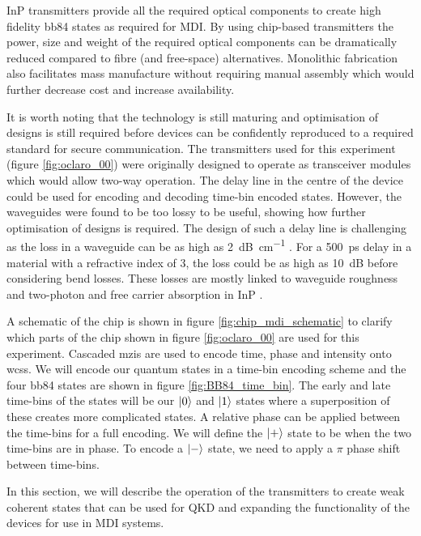 \Ac{InP} transmitters provide all the required optical components to create high fidelity \ac{bb84} states as required for \ac{MDI}. By using chip-based transmitters the power, size and weight of the required optical components can be dramatically reduced compared to fibre (and free-space) alternatives. Monolithic fabrication also facilitates mass manufacture without requiring manual assembly which would further decrease cost and increase availability.

It is worth noting that the technology is still maturing and optimisation of designs is still required before devices can be confidently reproduced to a required standard for secure communication. The transmitters used for this experiment (figure \ref{fig:oclaro_00}) were originally designed to operate as transceiver modules which would allow two-way operation. The delay line in the centre of the device could be used for encoding and decoding time-bin encoded states. However, the waveguides were found to be too lossy to be useful, showing how further optimisation of designs is required. The design of such a delay line is challenging as the loss in a waveguide can be as high as \SI{2}{dB\per\cm} \cite{JeppixRoadmap}. For a \SI{500}{ps} delay in a material with a refractive index of 3, the loss could be as high as \SI{10}{dB} before considering bend losses. These losses are mostly linked to waveguide roughness and two-photon and free carrier absorption in \ac{InP} \cite{Kumar2019}.
\begin{parahigh}
A schematic of the chip is shown in figure \ref{fig:chip_mdi_schematic} to clarify which parts of the chip shown in figure \ref{fig:oclaro_00} are used for this experiment. Cascaded \acp{mzi} are used to encode time, phase and intensity onto \acp{wcs}.  We will encode our quantum states in a time-bin encoding scheme and the four \ac{bb84} states are shown in figure \ref{fig:BB84_time_bin}. The early and late time-bins of the states will be our $\ket{0}$ and $\ket{1}$ states where a superposition of these creates more complicated states. A relative phase can be applied between the time-bins for a full encoding. We will define the $\ket{+}$ state to be when the two time-bins are in phase. To encode a $\ket{-}$ state, we need to apply a $\pi$ phase shift between time-bins. 
\end{parahigh}
In this section, we will describe the operation of the transmitters to create weak coherent states that can be used for \acl{QKD} and expanding the functionality of the devices for use in \ac{MDI} systems.

